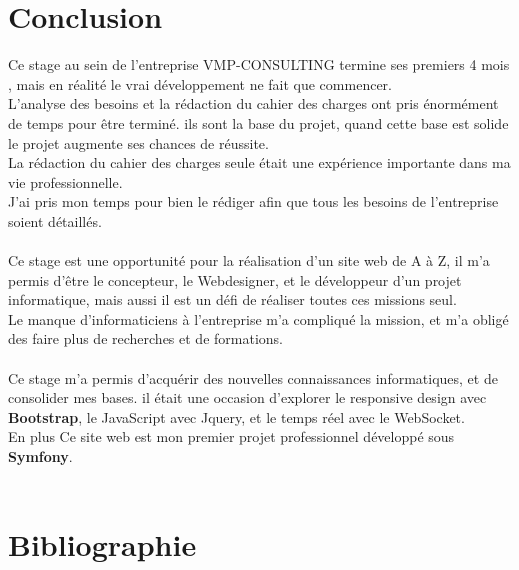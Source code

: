 \documentclass[12pt]{article}
\begin{document}
 


\newpage
\section{Conclusion}

Ce stage au sein de l'entreprise VMP-CONSULTING termine ses premiers 4 mois , mais en réalité le vrai développement ne fait que commencer.\\

L'analyse des besoins et la rédaction du cahier des charges ont pris énormément de temps   pour être terminé. ils sont la base du projet, quand cette base est solide le projet augmente ses chances de réussite. \\
La rédaction du cahier des charges seule était une expérience importante dans ma vie professionnelle.\\ 
J'ai pris mon temps pour bien le rédiger  afin que tous les besoins de l'entreprise soient détaillés.
  \\ \\

Ce stage est une opportunité pour la réalisation d'un site web de A à Z, il m'a permis d’être le concepteur, le Webdesigner, et le développeur d'un projet informatique, mais aussi il est un défi de réaliser toutes ces missions seul. \\ Le manque d'informaticiens à l'entreprise  m'a compliqué la mission, et  m'a obligé des faire plus de recherches et de formations.\\ \\

Ce stage m'a permis d’acquérir des nouvelles connaissances informatiques, et de consolider mes bases. il était une occasion d'explorer le responsive design avec \textbf{Bootstrap}, le JavaScript avec Jquery, et le temps réel avec le WebSocket.\\
En plus Ce site web est  mon premier projet professionnel développé sous \textbf{Symfony}.\\
\\







\newpage
\section{Bibliographie}
\end{document}
